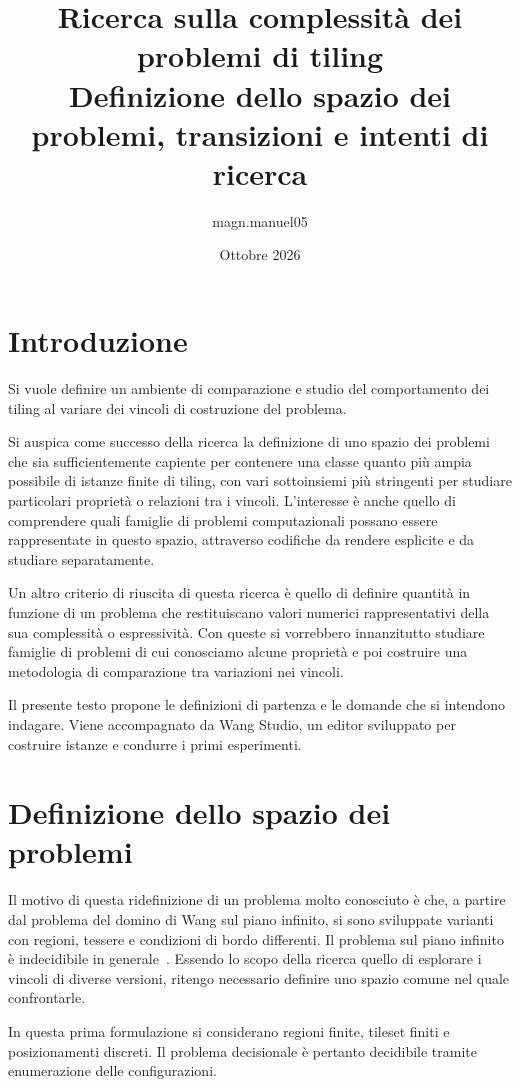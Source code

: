 \documentclass[11pt,a4paper]{article}
\title{Ricerca sulla complessità dei problemi di tiling\\[0.4em]
\large Definizione dello spazio dei problemi, transizioni e intenti di ricerca}
\author{magn.manuel05}
\date{Ottobre 2026}
\begin{document}
\maketitle

\section{Introduzione}

Si vuole definire un ambiente di comparazione e studio del comportamento dei tiling al variare dei vincoli di costruzione del problema.

Si auspica come successo della ricerca la definizione di uno spazio dei problemi che sia sufficientemente capiente per contenere una classe quanto più ampia possibile di istanze finite di tiling, con vari sottoinsiemi più stringenti per studiare particolari proprietà o relazioni tra i vincoli. L'interesse è anche quello di comprendere quali famiglie di problemi computazionali possano essere rappresentate in questo spazio, attraverso codifiche da rendere esplicite e da studiare separatamente.

Un altro criterio di riuscita di questa ricerca è quello di definire quantità in funzione di un problema che restituiscano valori numerici rappresentativi della sua complessità o espressività. Con queste si vorrebbero innanzitutto studiare famiglie di problemi di cui conosciamo alcune proprietà e poi costruire una metodologia di comparazione tra variazioni nei vincoli.

Il presente testo propone le definizioni di partenza e le domande che si intendono indagare. Viene accompagnato da Wang Studio, un editor sviluppato per costruire istanze e condurre i primi esperimenti. 

\section{Definizione dello spazio dei problemi}

Il motivo di questa ridefinizione di un problema molto conosciuto è che, a partire dal problema del domino di Wang sul piano infinito, si sono sviluppate varianti con regioni, tessere e condizioni di bordo differenti. Il problema sul piano infinito è indecidibile in generale~\cite{berger}. Essendo lo scopo della ricerca quello di esplorare i vincoli di diverse versioni, ritengo necessario definire uno spazio comune nel quale confrontarle.

In questa prima formulazione si considerano regioni finite, tileset finiti e posizionamenti discreti. Il problema decisionale è pertanto decidibile tramite enumerazione delle configurazioni.
\end{document}
